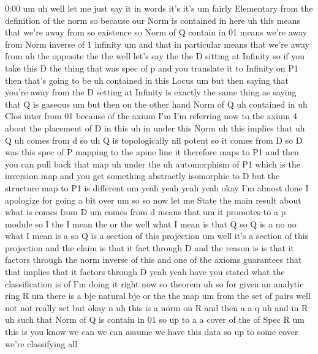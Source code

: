 \begin{unfinished}{0:00}
um
uh  well  let  me  just  say  it  in  words  it's
it's  um  fairly  Elementary  from  the
definition  of  the  norm  so  because  our
Norm  is  contained  in  here  uh  this  means
that  we're  away  from  so
existence  so  Norm  of  Q  contain  in  01
means  we're  away
from  Norm  inverse  of  1
infinity  um  and  that  in  particular  means
that  we're  away
from  uh  the
opposite  the  the  well  let's  say  the  the
D  sitting  at
Infinity  so  if  you  take  this  D  the  thing
that  was  spec  of  p  and  you  translate  it
to  Infinity  on  P1  then  that's  going  to
be  uh  contained  in  this  Locus
um  but  then  saying  that  you're  away  from
the  D  setting  at  Infinity  is  exactly  the
same  thing  as  saying  that  Q  is
gaseous  um  but  then  on  the  other  hand
Norm  of  Q  uh  contained  in  uh  Clos  inter
from  01  because  of  the  axium  I'm  I'm
referring  now  to  the  axium  4  about  the
placement  of  D  in  this  uh  in  under  this
Norm  uh  this  implies  that  uh  Q  uh  comes
from  d
so  uh  Q  is  topologically  nil
potent  so  it  comes  from
D  so  D  was  this  spec  of  P  mapping  to  the
apine  line  it  therefore  maps  to
P1  and  then  you  can  pull  back  that  map
uh  under  the  uh  automorphism  of  P1  which
is  the  inversion  map  and  you  get
something  abstractly  isomorphic  to  D  but
the  structure  map  to  P1  is
different  um
yeah  yeah  yeah
yeah
okay  I'm  almost  done  I  apologize  for
going  a  bit  over
um
so  so  now  let  me  State  the  main  result
about
what  is  comes  from  D
um  comes  from  d  means  that  um  it
promotes  to  a  p
module  so  I  the  I  mean  the  or  the
well  what  I  mean  is  that  Q  so  Q  is  a  no
no  what  I  mean  is  a  so  Q  is  a  section  of
this
projection  um  well  it's  a  section  of
this
projection  and  the  claim  is  that  it  fact
through
D  and  the  reason  is  is  that  it  factors
through  the  norm  inverse  of  this  and  one
of  the  axioms  guarantees  that  that
implies  that  it  factors  through  D  yeah
yeah  have  you  stated  what  the
classification  is  of  I'm  doing  it  right
now  so
theorem  uh  so  for  given  an  analytic  ring
R  um  there  is  a  bje  natural  bje  or  the
the
map  um  from  the  set  of  pairs  well  not
not  really  set  but  okay
n  uh  this  is  a  norm  on
R  and  then  a  a  q  uh  and  in
R  uh  such  that  Norm  of  Q  is  contain  in
01  so  up  to  a  a  cover  of  the  of  Spec  R
um  this  is  you  know  we  can  we  can  assume
we  have  this  data  so  up  to  some  cover
we're  classifying  all

\end{unfinished}
